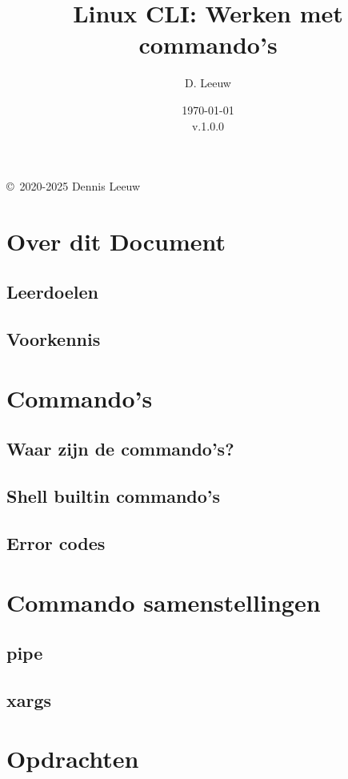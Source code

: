 \documentclass[a4paper,12pt,twoside,openright,titlepage]{book}
\author{D. Leeuw}
\title{Linux CLI: Werken met commando's}
\date{\today\\v.1.0.0}
\begin{document}

\maketitle

\copyright\ 2020-2025 Dennis Leeuw\\




\frontmatter
\chapter{Over dit Document}
\section{Leerdoelen}

\section{Voorkennis}

%
%

\tableofcontents

\mainmatter
\chapter{Commando's}

\section{Waar zijn de commando's?}


\section{Shell builtin commando's}

\section{Error codes}

\chapter{Commando samenstellingen}

\section{pipe}

\section{xargs}

\chapter{Opdrachten}


\backmatter
\printindex
\end{document}
